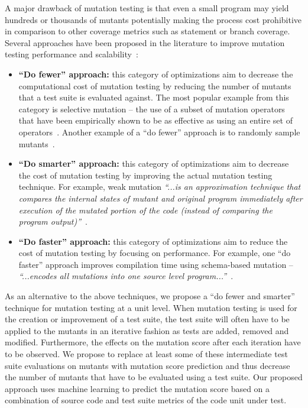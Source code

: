 \documentclass[conference]{IEEEtran}
\begin{document}
A major drawback of mutation testing is that even a small program may yield hundreds or thousands of mutants potentially making the process cost prohibitive in comparison to other coverage metrics such as statement or branch coverage. Several approaches have been proposed in the literature to improve mutation testing performance and scalability~\cite{OU00}:

\begin{itemize}
  \item \textbf{``Do fewer'' approach:} this category of optimizations aim to decrease the computational cost of mutation testing by reducing the number of mutants that a test suite is evaluated against. The most popular example from this category is selective mutation -- the use of a subset of mutation operators that have been empirically shown to be as effective as using an entire set of operators~\cite{OLR+96}. Another example of a ``do fewer'' approach is to randomly sample mutants~\cite{Won93}.

  \item \textbf{``Do smarter'' approach:} this category of optimizations aim to decrease the cost of mutation testing by improving the actual mutation testing technique. For example, weak mutation \emph{``...is an approximation technique that compares the internal states of mutant and original program immediately after execution of the mutated portion of the code (instead of comparing the program output)''}~\cite{OU00}.

  \item \textbf{``Do faster'' approach:} this category of optimizations aim to reduce the cost of mutation testing by focusing on performance. For example, one ``do faster'' approach improves compilation time using schema-based mutation -- \emph{``...encodes all mutations into one source level program...''}~\cite{OU00}.
\end{itemize}

As an alternative to the above techniques, we propose a ``do fewer and smarter'' technique for mutation testing at a unit level.  When mutation testing is used for the creation or improvement of a test suite,  the test suite will often have to be applied to the mutants in an iterative fashion as tests are added, removed and modified. Furthermore, the effects on the mutation score after each iteration have to be observed. We propose to replace at least some of these intermediate test suite evaluations on mutants with mutation score prediction and thus decrease the number of mutants that have to be evaluated using a test suite. Our proposed approach uses machine learning to predict the mutation score based on a combination of source code and test suite metrics of the code unit under test.
\end{document}
